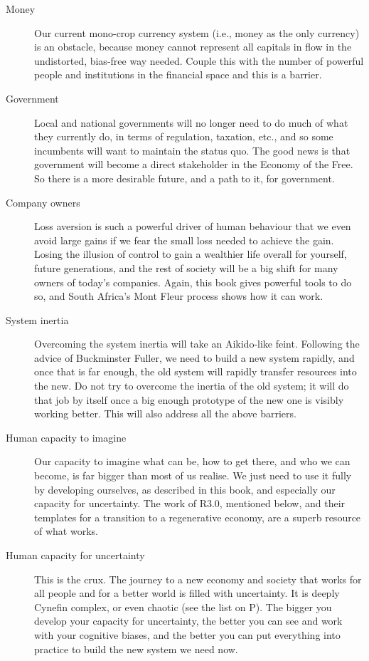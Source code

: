 \begin{description}
\item[Money] Our current mono-crop currency system (i.e., money as the only currency) is an obstacle, because money cannot represent all capitals in flow in the undistorted, bias-free way needed. Couple this with the number of powerful people and institutions in the financial space and this is a barrier. 


\item[Government] Local and national governments will no longer need to do much of what they currently do, in terms of regulation, taxation, etc., and so some incumbents will want to maintain the status quo. The good news is that government will become a direct stakeholder in the Economy of the Free. So there is a more desirable future, and a path to it, for government.


\item[Company owners] Loss aversion is such a powerful driver of human behaviour that we even avoid large gains if we fear the small loss needed to achieve the gain. Losing the illusion of control to gain a wealthier life overall for yourself, future generations, and the rest of society will be a big shift for many owners of today's companies. Again, this book gives powerful tools to do so, and South Africa’s Mont Fleur process shows how it can work.


\item[System inertia] Overcoming the system inertia will take an Aikido-like feint. Following the advice of Buckminster Fuller, we need to build a new system rapidly, and once that is far enough, the old system will rapidly transfer resources into the new. Do not try to overcome the inertia of the old system; it will do that job by itself once a big enough prototype of the new one is visibly working better. This will also address all the above barriers. 


\item[Human capacity to imagine] Our capacity to imagine what can be, how to get there, and who we can become, is far bigger than most of us realise. We just need to use it fully by developing ourselves, as described in this book, and especially our capacity for uncertainty. The work of R3.0, mentioned below, and their templates for a transition to a regenerative economy, are a superb resource of what works.


\item[Human capacity for uncertainty]  This is the crux. The journey to a new economy and society that works for all people and for a better world is filled with uncertainty. It is deeply Cynefin complex, or even chaotic (see the list on P\pageref{list:cynefin}). The bigger you develop your capacity for uncertainty, the better you can see and work with your cognitive biases, and the better you can put everything into practice to build the new system we need now.
\end{description}


